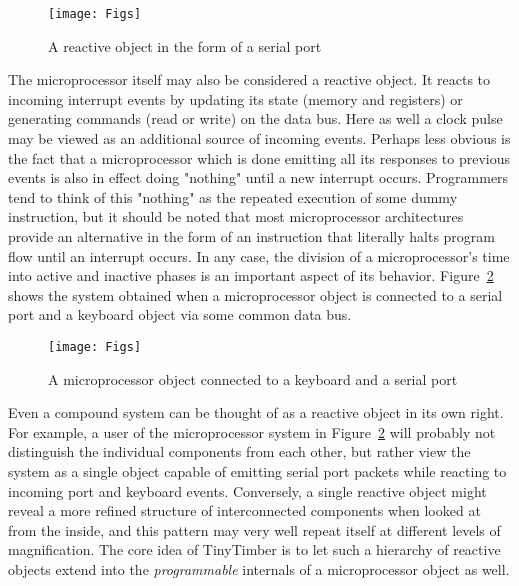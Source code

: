 \documentclass[12pt]{article}
\begin{document}
\begin{figure}
\begin{center}
\texttt{[image: Figs]}
\caption{\label{fig:serial-port}A reactive object in the form of a serial port}
\end{center}
\end{figure}

The microprocessor itself may also be considered a reactive object.  It reacts to incoming interrupt events by updating its state (memory and registers) or generating commands (read or write) on the data bus.  Here as well a clock pulse may be viewed as an additional source of incoming events.  Perhaps less obvious is the fact that a microprocessor which is done emitting all its responses to previous events is also in effect doing "nothing" until a new interrupt occurs.  Programmers tend to think of this "nothing" as the repeated execution of some dummy instruction, but it should be noted that most microprocessor architectures provide an alternative in the form of an instruction that literally halts program flow until an interrupt occurs.  In any case, the division of a microprocessor's time into active and inactive phases is an important aspect of its behavior.  Figure~\ref{fig:cpu-system} shows the system obtained when a microprocessor object is connected to a serial port and a keyboard object via some common data bus.

\begin{figure}
\begin{center}
\texttt{[image: Figs]}
\caption{\label{fig:cpu-system}A microprocessor object connected to a keyboard and a serial port}
\end{center}
\end{figure}

Even a compound system can be thought of as a reactive object in its own right.  For example, a user of the microprocessor system in Figure~\ref{fig:cpu-system} will probably not distinguish the individual components from each other, but rather view the system as a single object capable of emitting serial port packets while reacting to incoming port and keyboard events.  Conversely, a single reactive object might reveal a more refined structure of interconnected components when looked at from the inside, and this pattern may very well repeat itself at different levels of magnification.  The core idea of TinyTimber is to let such a hierarchy of reactive objects extend into the {\em programmable} internals of a microprocessor object as well.
\end{document}
